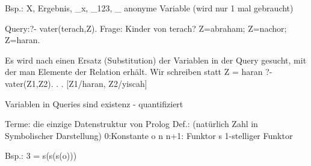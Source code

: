 \documentclass[11pt]{scrartcl}
\begin{document}
Bsp.: X, Ergebnis, _x, _123, _
							\nwarrow anonyme Variable (wird nur 1 mal gebraucht)

Query:?- vater(terach,Z).
Frage: Kinder von terach?
Z=abraham;
Z=nachor;
Z=haran.

Es wird nach einen Ersatz (Substitution) der Variablen in der Query gesucht, mit der man Elemente der Relation erhält.
Wir schreiben statt Z = haran \rightarrow [Z/haran]
?- vater(Z1,Z2)
									.
									.
									.
							[Z1/haran, Z2/yiscah]
							
Variablen in Queries sind existenz - quantifiziert

Terme: die einzige Datenstruktur von Prolog
Def.: (natürlich Zahl in Symbolischer Darstellung)
		0\in {}:Konstante o
		n\in {} \Rightarrow n+1\in {}: Funktor s 1-stelliger Funktor

Bsp.: 3 = s(s(s(o)))
\end{document}
